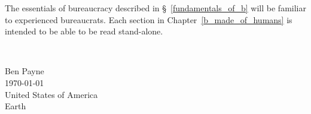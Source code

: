 

The essentials of bureaucracy described in \S~\ref{fundamentals_of_b} will be familiar to experienced bureaucrats. Each section in Chapter~\ref{b_made_of_humans} is intended to be able to be read stand-alone. %

\ \\

\begin{flushright}
Ben Payne\\
\today\\
United States of America\\
Earth
\end{flushright}


